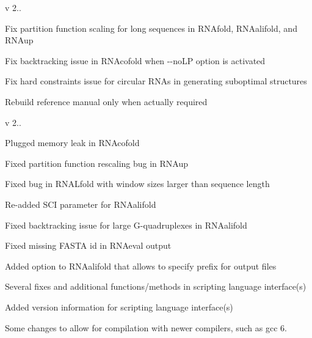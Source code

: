 v 2..
\begin{DoxyItemize}
\item Fix partition function scaling for long sequences in R\+N\+Afold, R\+N\+Aalifold, and R\+N\+Aup
\item Fix backtracking issue in R\+N\+Acofold when -\/-\/no\+LP option is activated
\item Fix hard constraints issue for circular R\+N\+As in generating suboptimal structures
\item Rebuild reference manual only when actually required
\end{DoxyItemize}

v 2..
\begin{DoxyItemize}
\item Plugged memory leak in R\+N\+Acofold
\item Fixed partition function rescaling bug in R\+N\+Aup
\item Fixed bug in R\+N\+A\+Lfold with window sizes larger than sequence length
\item Re-\/added S\+CI parameter for R\+N\+Aalifold
\item Fixed backtracking issue for large G-\/quadruplexes in R\+N\+Aalifold
\item Fixed missing F\+A\+S\+TA id in R\+N\+Aeval output
\item Added option to R\+N\+Aalifold that allows to specify prefix for output files
\item Several fixes and additional functions/methods in scripting language interface(s)
\item Added version information for scripting language interface(s)
\item Some changes to allow for compilation with newer compilers, such as gcc 6.
\end{DoxyItemize}

